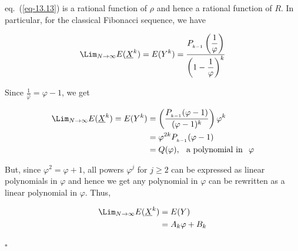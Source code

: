 \begin{multicols}{2}
\vspace{-.3cm}

eq.~(\ref{eq-13.13}) is a rational function of $\rho$ and hence a rational function of $R$. In particular, for the classical Fibonacci sequence, we have

\vspace{-.6cm}

\begin{equation}\nonumber
\displaystyle{\Lim_{N \rightarrow \infty}} E(\underline{X}^k) = E(Y^k) = \frac{P_{_{k-1}}\left(\displaystyle{\frac{1}{\varphi}}\right)}{\left(1-\displaystyle{\frac{1}{\varphi}}\right)^k}
\end{equation}

\vspace{-.8cm}

Since $\displaystyle{\frac{1}{\varphi}} = \varphi-1$, we get

\vspace{-.8cm}
\begin{align}
\displaystyle{\Lim_{N \rightarrow \infty}} E(\underline{X}^k) = E(Y^k) &= \left(\frac{P_{_{k-1}}(\varphi-1)}{(\varphi-1)^k}\right)\varphi^k\nonumber\\
&= \varphi^{2k} P_{_{k-1}}(\varphi-1)\nonumber\\
&= Q(\varphi), \hspace{0.1in}\textup{a polynomial in}\hspace{0.1in} \varphi \label{eq-13.14}
\end{align}

\vspace{-.6cm}

But, since $\varphi^2 = \varphi + 1$, all powers $\varphi^j$ for $j\ge2$ can be expressed as linear polynomials in $\varphi$ and hence we get any polynomial in $\varphi$ can be rewritten as a linear polynomial in $\varphi$. Thus,

\vspace{-.9cm}

\begin{align}
 \displaystyle{\Lim_{N \rightarrow \infty}} E(\underline{X}^k) &= E(Y)\label{eq-13.15}\\
         &= A_k\varphi + B_k\label{eq-13.16}
\end{align}

\vspace{-.6cm}

\hfill{$\square$}

\vspace{-.5cm}


\end{multicols}
